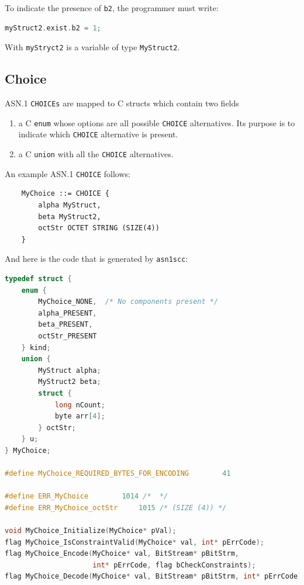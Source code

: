 \documentclass[11pt]{book}
\begin{document}
      To indicate the presence of \texttt{b2}, the programmer must write:

\begin{lstlisting}[language=c]
myStruct2.exist.b2 = 1;
\end{lstlisting}

      With \texttt{myStryct2} is a variable of type \texttt{MyStruct2}.

      \subsection{Choice}
      ASN.1 \texttt{CHOICEs} are mapped to C structs which contain two fields
      \begin{enumerate}
         \item
            a C \texttt{enum} whose options are all possible
            \texttt{CHOICE} alternatives. 
            Its purpose is to indicate which \texttt{CHOICE} 
            alternative is present. 
         \item
            a C \texttt{union} with all the 
            \texttt{CHOICE} alternatives. 
      \end{enumerate}

      An example ASN.1 \texttt{CHOICE} follows:

\begin{lstlisting}
	MyChoice ::= CHOICE {
		alpha MyStruct,
		beta MyStruct2,
		octStr OCTET STRING (SIZE(4))
	}
\end{lstlisting}

      And here is the code that is generated by \texttt{asn1scc}:

\begin{lstlisting}[language=c]
typedef struct {
    enum {
        MyChoice_NONE,	/* No components present */
        alpha_PRESENT,
        beta_PRESENT,
        octStr_PRESENT
    } kind;
    union {
        MyStruct alpha;
        MyStruct2 beta;
        struct {
            long nCount;
            byte arr[4];
        } octStr;
    } u;
} MyChoice;

#define MyChoice_REQUIRED_BYTES_FOR_ENCODING		41

#define ERR_MyChoice		1014 /*  */
#define ERR_MyChoice_octStr		1015 /* (SIZE (4)) */

void MyChoice_Initialize(MyChoice* pVal);
flag MyChoice_IsConstraintValid(MyChoice* val, int* pErrCode);
flag MyChoice_Encode(MyChoice* val, BitStream* pBitStrm, 
                     int* pErrCode, flag bCheckConstraints);
flag MyChoice_Decode(MyChoice* val, BitStream* pBitStrm, int* pErrCode);

\end{lstlisting}
\end{document}

